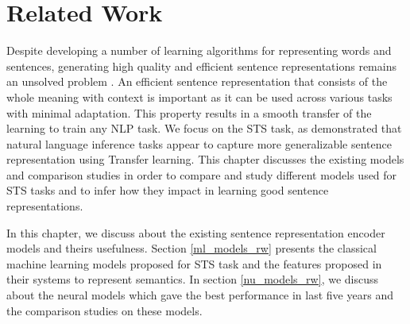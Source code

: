 \documentclass[12pt]{report} %
\begin{document}
%
%
%
% 


\chapter{Related Work}
\label{related_work}


Despite developing a number of learning algorithms for representing words and sentences, generating high quality and efficient sentence representations remains an unsolved problem \citep{conneau2017supervised}. An efficient sentence representation that consists of the whole meaning with context is important as it can be used across various tasks with minimal adaptation. This property results in a smooth transfer of the learning to train any NLP task. We focus on the STS task, as \cite{conneau2017supervised} demonstrated that natural language inference tasks appear to capture more generalizable sentence representation using Transfer learning. This chapter discusses the existing models and comparison studies in order to compare and study different models used for STS tasks and to infer how they impact in learning good sentence representations.

In this chapter, we discuss about the existing sentence representation encoder models and theirs usefulness. Section \ref{ml_models_rw} presents the classical machine learning models proposed for STS task and the features proposed in their systems to represent semantics.  In section \ref{nu_models_rw}, we discuss about the neural models which gave the best performance in last five years and the comparison studies on these models.
\end{document}
